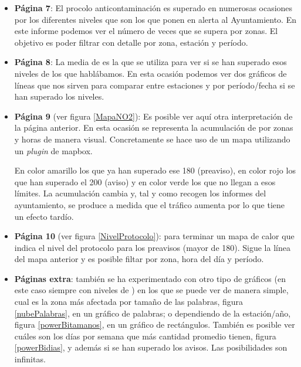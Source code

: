 \begin{itemize}
	\item \textbf{Página 7}: El procolo anticontaminación es superado en numerosas ocasiones por los diferentes niveles que son los que ponen en alerta al Ayuntamiento. En este informe podemos ver el número de veces que se supera por zonas. El objetivo es poder filtrar con detalle por zona, estación y período.  
	
	\item \textbf{Página 8}: La media de  es la que se utiliza para ver si se han superado esos niveles de los que hablábamos. En esta ocasión podemos ver dos gráficos de líneas que nos sirven para comparar entre estaciones y por período/fecha si se han superado los niveles.
	
	\item \textbf{Página 9} (ver figura \ref{MapaNO2}): Es posible ver aquí otra interpretación de la página anterior. En esta ocasión se representa la  acumulación de  por zonas y horas de manera visual. Concretamente se hace uso de un mapa utilizando un \textit{plugin} de mapbox. 
	
	En color amarillo los que ya han superado ese 180 (preaviso), en color rojo los que han superado el 200 (aviso) y en color verde los que no llegan a esos límites. La acumulación cambia y, tal y como recogen los informes del ayuntamiento, se produce a medida que el tráfico aumenta por lo que tiene un efecto tardío.
	
	
	\item \textbf{Página 10} (ver figura \ref{NivelProtocolo}): para terminar un mapa de calor que indica el nivel del protocolo para los preavisos (mayor de 180). Sigue la línea del mapa anterior y es posible filtar por zona, hora del día y período.
	
	
	\item \textbf{Páginas extra}: también se ha experimentado con otro tipo de gráficos (en este caso siempre con niveles de ) en los que se puede ver de manera simple, cual es la zona más afectada por tamaño de las palabras, figura \ref{nubePalabras}, en un gráfico de palabras; o dependiendo de la estación/año, figura \ref{powerBitamanos}, en un gráfico de rectángulos. También es posible ver cuáles son los días por semana que más cantidad promedio tienen, figura \ref{powerBidias}, y además si se han superado los avisos. Las posibilidades son infinitas.
	
	
	
	

	
\end{itemize}



